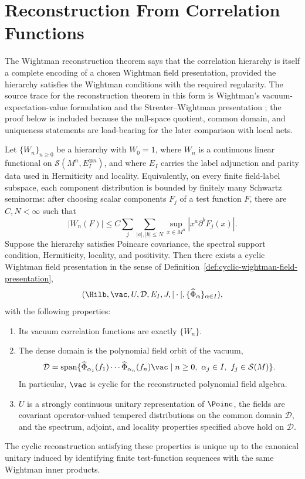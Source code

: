 \section{Reconstruction From Correlation Functions}

The Wightman reconstruction theorem says that the correlation hierarchy is
itself a complete encoding of a chosen Wightman field presentation, provided
the hierarchy satisfies the Wightman conditions with the required regularity.
The source trace for the reconstruction theorem in this form is
Wightman's vacuum-expectation-value formulation and the Streater--Wightman
presentation \cite{Wightman1956,StreaterWightman1964}; the proof below is
included because the null-space quotient, common domain, and uniqueness
statements are load-bearing for the later comparison with local nets.

\begin{theorem}
\label{thm:wightman-reconstruction}
Let \(\{W_n\}_{n\ge0}\) be a hierarchy with \(W_0=1\), where \(W_n\) is a
continuous linear functional on
\(\mathcal S(M^n,E_I^{\otimes n})\), and where \(E_I\) carries the label
adjunction and parity data used in Hermiticity and locality.  Equivalently,
on every finite
field-label subspace, each component distribution is bounded by finitely many
Schwartz seminorms: after choosing scalar components \(F_j\) of a test function
\(F\), there are \(C,N<\infty\) such that
\[
  |W_n(F)|
  \le
  C\sum_j\sum_{|a|,|b|\le N}
  \sup_{x\in M^n}|x^a\partial^b F_j(x)| .
\]
Suppose the hierarchy satisfies Poincare covariance, the spectral support
condition, Hermiticity, locality, and positivity.  Then there exists a cyclic
Wightman field presentation in the sense of
Definition~\ref{def:cyclic-wightman-field-presentation},
\[
  (\Hilb,\vac,U,\mathcal D,E_I,J,|\cdot|,
  \{\widehat\Phi_\alpha\}_{\alpha\in I}),
\]
with the following properties:
\begin{enumerate}[label=\textup{(\roman*)}]
\item Its vacuum correlation functions are exactly \(\{W_n\}\).
\item The dense domain is the polynomial field orbit of the vacuum,
\[
  \mathcal D
  =
  \operatorname{span}\{
    \widehat\Phi_{\alpha_1}(f_1)\cdots
    \widehat\Phi_{\alpha_n}(f_n)\vac
    \mid n\ge0,\ \alpha_j\in I,\ f_j\in\mathcal S(M)
  \}.
\]
In particular, \(\vac\) is cyclic for the reconstructed polynomial field
algebra.
\item \(U\) is a strongly continuous unitary representation of \(\Poinc\), the
fields are covariant operator-valued tempered distributions on the common
domain \(\mathcal D\), and the spectrum, adjoint, and locality properties
specified above hold on \(\mathcal D\).
\end{enumerate}
The cyclic reconstruction satisfying these properties is unique up to the
canonical unitary induced by identifying finite test-function sequences with
the same Wightman inner products.

\end{theorem}

